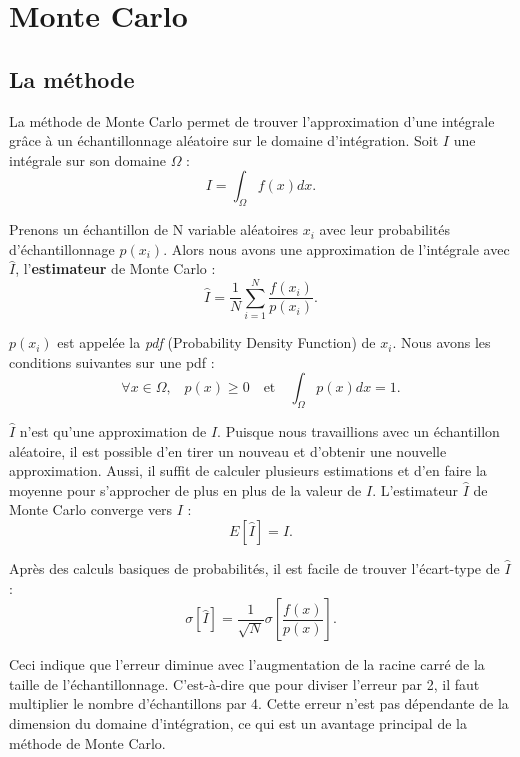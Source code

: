 \chapter{Monte Carlo}

\section{La méthode}

La méthode de Monte Carlo permet de trouver l'approximation d'une intégrale grâce à un échantillonnage aléatoire sur le domaine d'intégration. Soit $I$ une intégrale sur son domaine $\Omega$ :
\large \begin{equation}
    I = \int_{\Omega}f(x)dx
.\end{equation} \normalsize \par
Prenons un échantillon de N variable aléatoires $x_{i}$ avec leur probabilités d'échantillonnage $p(x_{i})$. Alors nous avons une approximation de l'intégrale avec $\hat I$, l'\textbf{estimateur} de Monte Carlo :
\large \begin{equation}
    \hat I = \frac{1}{N}\sum\limits_{i=1}^{N} \frac{f(x_{i})}{p(x_{i})}
.\end{equation} \normalsize \par
$p(x_{i})$ est appelée la \textit{pdf} (Probability Density Function) de $x_{i}$. Nous avons les conditions suivantes sur une pdf :
\large \begin{equation}
    \forall x \in \Omega
    \text{,}\quad
    p(x) \geq 0
    \quad\text{et}\quad
    \int_{\Omega}p(x)dx=1
.\end{equation} \normalsize \newline\par

$\hat I$ n'est qu'une approximation de $I$. Puisque nous travaillions avec un échantillon aléatoire, il est possible d'en tirer un nouveau et d'obtenir une nouvelle approximation. Aussi, il suffit de calculer plusieurs estimations et d'en faire la moyenne pour s'approcher de plus en plus de la valeur de $I$. L'estimateur $\hat I$ de Monte Carlo converge vers $I$ :
\large \begin{equation}
    E\left[\hat I\right] = I
.\end{equation} \normalsize \newline\par

Après des calculs basiques de probabilités, il est facile de trouver l'écart-type de $\hat I$ :
\large \begin{equation}
    \sigma\left[\hat I\right] = \frac{1}{\sqrt{N}}\sigma\left[\frac{f(x)}{p(x)}\right]
.\end{equation} \normalsize \par
Ceci indique que l'erreur diminue avec l'augmentation de la racine carré de la taille de l'échantillonnage. C'est-à-dire que pour diviser l'erreur par 2, il faut multiplier le nombre d'échantillons par 4. Cette erreur n'est pas dépendante de la dimension du domaine d'intégration, ce qui est un avantage principal de la méthode de Monte Carlo.


